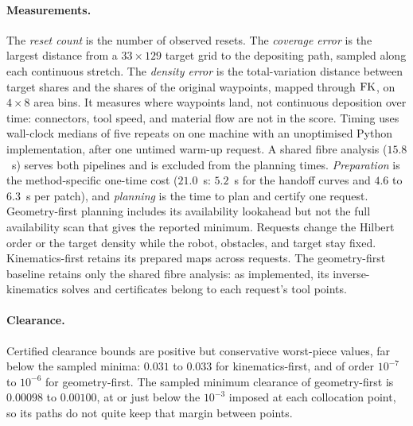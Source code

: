 \paragraph{Measurements.}
The \emph{reset count} is the number of observed resets. The \emph{coverage error} is the largest distance from a $33\times129$ target grid to the depositing path, sampled along each continuous stretch. The \emph{density error} is the total-variation distance between target shares and the shares of the original waypoints, mapped through $\operatorname{FK}$, on $4\times8$ area bins. It measures where waypoints land, not continuous deposition over time: connectors, tool speed, and material flow are not in the score. Timing uses wall-clock medians of five repeats on one machine with an unoptimised Python implementation, after one untimed warm-up request. A shared fibre analysis ($15.8$~s) serves both pipelines and is excluded from the planning times. \emph{Preparation} is the method-specific one-time cost ($21.0$~s: $5.2$~s for the handoff curves and $4.6$ to $6.3$~s per patch), and \emph{planning} is the time to plan and certify one request. Geometry-first planning includes its availability lookahead but not the full availability scan that gives the reported minimum. Requests change the Hilbert order or the target density while the robot, obstacles, and target stay fixed. Kinematics-first retains its prepared maps across requests. The geometry-first baseline retains only the shared fibre analysis: as implemented, its inverse-kinematics solves and certificates belong to each request's tool points.

\paragraph{Clearance.}
Certified clearance bounds are positive but conservative worst-piece values, far below the sampled minima: $0.031$ to $0.033$ for kinematics-first, and of order $10^{-7}$ to $10^{-6}$ for geometry-first. The sampled minimum clearance of geometry-first is $0.00098$ to $0.00100$, at or just below the $10^{-3}$ imposed at each collocation point, so its paths do not quite keep that margin between points.
